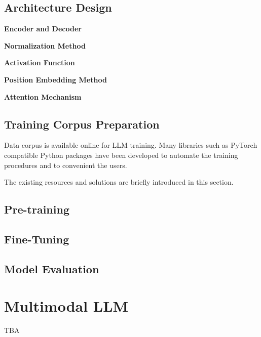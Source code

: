 \subsection{Architecture Design}

\vspace{0.1in}
\noindent \textbf{Encoder and Decoder}
\vspace{0.1in}

\vspace{0.1in}
\noindent \textbf{Normalization Method}
\vspace{0.1in}

\vspace{0.1in}
\noindent \textbf{Activation Function}
\vspace{0.1in}

\vspace{0.1in}
\noindent \textbf{Position Embedding Method}
\vspace{0.1in}

\vspace{0.1in}
\noindent \textbf{Attention Mechanism}
\vspace{0.1in}

\subsection{Training Corpus Preparation}

Data corpus is available online for LLM training. Many libraries such as PyTorch compatible Python packages have been developed to automate the training procedures and to convenient the users.

The existing resources and solutions are briefly introduced in this section.

\subsection{Pre-training}

\subsection{Fine-Tuning}

\subsection{Model Evaluation}

\section{Multimodal LLM}

TBA


